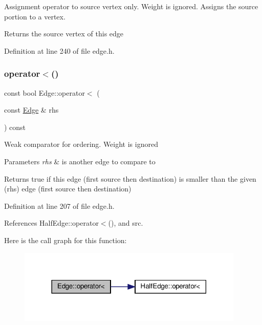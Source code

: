 Assignment operator to source vertex only. Weight is ignored. Assigns the source portion to a vertex. \begin{DoxyReturn}{Returns}
the source vertex of this edge 
\end{DoxyReturn}


Definition at line 240 of file edge.\+h.

\mbox{\label{classEdge_a97799770a75ae0d09208203bdeb6cfee}} 
\subsubsection{\texorpdfstring{operator$<$()}{operator<()}}
{\footnotesize\ttfamily const bool Edge\+::operator$<$ (\begin{DoxyParamCaption}\item[{const \hyperlink{classEdge}{Edge} \&}]{rhs }\end{DoxyParamCaption}) const\hspace{0.3cm}{\ttfamily [inline]}}

Weak comparator for ordering. Weight is ignored 
\begin{DoxyParams}{Parameters}
{\em rhs} & is another edge to compare to \\
\hline
\end{DoxyParams}
\begin{DoxyReturn}{Returns}
true if this edge (first source then destination) is smaller than the given (rhs) edge (first source then destination) 
\end{DoxyReturn}


Definition at line 207 of file edge.\+h.



References Half\+Edge\+::operator$<$(), and src.

Here is the call graph for this function\+:\nopagebreak
\begin{figure}[H]
\begin{center}
\leavevmode
\includegraphics[width=306pt]{classEdge_a97799770a75ae0d09208203bdeb6cfee_cgraph}
\end{center}
\end{figure}
\mbox{\label{classEdge_abe84b58ced477ebeef5078e4cb48b49f}} 
